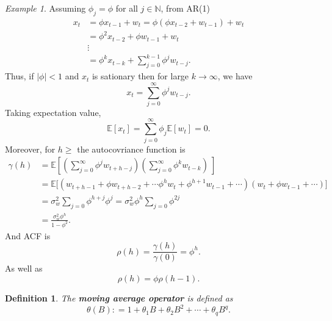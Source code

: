 \documentclass[10pt,titlepage,oneside,openany]{report}
\theoremstyle{remark}
\newtheorem{Example}{Example}[section]
\theoremstyle{plain}
\newtheorem{Definition}{Definition}[section]
\newcommand{\N}{\mathbb{N}}
\numberwithin{equation}{section}
\renewcommand{\geq}{\geqslant}
\begin{document}
\begin{Example}
	Assuming  $\phi_j = \phi$ for all $j \in \N$, from AR(1)
		\begin{align*}
			x_t & = \phi x_{t-1} + w_t = \phi(\phi x_{t-2} + w_{t-1}) + w_t\\
				  & =  \phi^2 x_{t-2}  + \phi w_{t-1} + w_t\\
				  & \vdots\\
				  & = \phi^k x_{t-k} + \sum_{j=0}^{k-1} \phi^j w_{t-j}.
		\end{align*}
	Thus, if $|\phi| < 1$ and $x_t$ is sationary then for large $k\to\infty$, we have
		\[
		x_t = \sum_{j=0}^\infty \phi^j w_{t-j}.
		\]
	Taking expectation value,
	\[
		\mathds{E}[x_t] = \sum_{j=0}^\infty	 \phi_j \mathds{E}[w_t] = 0.
	\]
	Moreover, for $h\geq $ the autocovriance function is
	\begin{align*}
		\gamma(h) &= \mathds{E} \left[\left(\sum_{j=0}^\infty \phi^j w_{t+h-j} \right) \left(\sum_{j=0}^\infty \phi^k w_{t-k} \right)\ \right]\\
			& = \mathds{E} \big[(w_{t+h-1}+ \phi w_{t+h-2} + \cdots \phi^h w_{t} + \phi^{h+1} w_{t-1} + \cdots ) (w_t + \phi w_{t-1}+ \cdots)\big]\\
			& = \sigma_w^2 \sum_{j=0} \phi^{h+j} \phi^j = \sigma_w^2 \phi^h \sum_{j=0} \phi^{2j}\\
			& = \frac{\sigma_w^2 \phi^h}{1-\phi^{2}}.
	\end{align*}
And ACF is
	\[
	\rho(h) = \frac{\gamma(h)}{\gamma(0)} = \phi^h.
	\]
As well as
	\[
	\rho(h)  =\phi \rho(h-1).
	\]
\end{Example}

\begin{Definition}
	The \textbf{moving average operator} is defined as
	\[
		\theta(B) : = 1 + \theta_1 B + \theta_2 B^2 + \cdots + \theta_q B^q.
	\]
\end{Definition}

\clearpage
%
%
\end{document}
